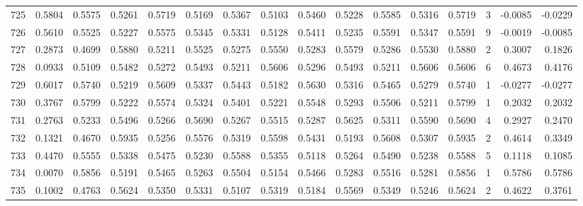 \begin{tabular}{lrrrrrrrrrrrrrrr}
725 &      0.5804 &  0.5575 &  0.5261 &  0.5719 &  0.5169 &  0.5367 &  0.5103 &  0.5460 &  0.5228 &  0.5585 &   0.5316 &     0.5719 &      3 &                   -0.0085 &                    -0.0229 \\
726 &      0.5610 &  0.5525 &  0.5227 &  0.5575 &  0.5345 &  0.5331 &  0.5128 &  0.5411 &  0.5235 &  0.5591 &   0.5347 &     0.5591 &      9 &                   -0.0019 &                    -0.0085 \\
727 &      0.2873 &  0.4699 &  0.5880 &  0.5211 &  0.5525 &  0.5275 &  0.5550 &  0.5283 &  0.5579 &  0.5286 &   0.5530 &     0.5880 &      2 &                    0.3007 &                     0.1826 \\
728 &      0.0933 &  0.5109 &  0.5482 &  0.5272 &  0.5493 &  0.5211 &  0.5606 &  0.5296 &  0.5493 &  0.5211 &   0.5606 &     0.5606 &      6 &                    0.4673 &                     0.4176 \\
729 &      0.6017 &  0.5740 &  0.5219 &  0.5609 &  0.5337 &  0.5443 &  0.5182 &  0.5630 &  0.5316 &  0.5465 &   0.5279 &     0.5740 &      1 &                   -0.0277 &                    -0.0277 \\
730 &      0.3767 &  0.5799 &  0.5222 &  0.5574 &  0.5324 &  0.5401 &  0.5221 &  0.5548 &  0.5293 &  0.5506 &   0.5211 &     0.5799 &      1 &                    0.2032 &                     0.2032 \\
731 &      0.2763 &  0.5233 &  0.5496 &  0.5266 &  0.5690 &  0.5267 &  0.5515 &  0.5287 &  0.5625 &  0.5311 &   0.5590 &     0.5690 &      4 &                    0.2927 &                     0.2470 \\
732 &      0.1321 &  0.4670 &  0.5935 &  0.5256 &  0.5576 &  0.5319 &  0.5598 &  0.5431 &  0.5193 &  0.5608 &   0.5307 &     0.5935 &      2 &                    0.4614 &                     0.3349 \\
733 &      0.4470 &  0.5555 &  0.5338 &  0.5475 &  0.5230 &  0.5588 &  0.5355 &  0.5118 &  0.5264 &  0.5490 &   0.5238 &     0.5588 &      5 &                    0.1118 &                     0.1085 \\
734 &      0.0070 &  0.5856 &  0.5191 &  0.5465 &  0.5263 &  0.5504 &  0.5154 &  0.5466 &  0.5283 &  0.5516 &   0.5281 &     0.5856 &      1 &                    0.5786 &                     0.5786 \\
735 &      0.1002 &  0.4763 &  0.5624 &  0.5350 &  0.5331 &  0.5107 &  0.5319 &  0.5184 &  0.5569 &  0.5349 &   0.5246 &     0.5624 &      2 &                    0.4622 &                     0.3761 \\

\end{tabular}
